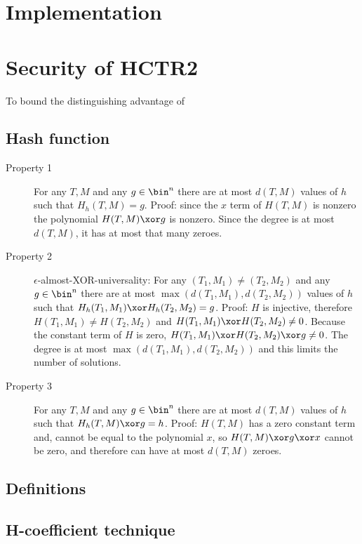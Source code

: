 \documentclass[letterpaper,11pt]{article}
\begin{document}
\section{Implementation}

\section{Security of HCTR2}
To bound the distinguishing advantage of

\subsection{Hash function}
\begin{description}
    \item[Property 1]
    For any \(T, M\) and any \(g \in \bin^n\)
    there are at most \(d(T, M)\)
    values of \(h\) such that \(H_h(T, M) = g\).
    Proof: since the \(x\) term of \(H(T, M)\) is nonzero
    the polynomial \(H(T, M) \xor g\) is nonzero.
    Since the degree is at most \(d(T, M)\), it has
    at most that many zeroes.
    \item[Property 2] 
    \(\epsilon\)-almost-XOR-universality: 
    For any \((T_1, M_1) \neq (T_2, M_2)\) and any \(g \in \bin^n\)
    there are at most \(\max(d(T_1, M_1), d(T_2, M_2))\)
    values of \(h\) such that \(H_h(T_1, M_1) \xor H_h(T_2, M_2) = g\).
    Proof: \(H\) is injective, therefore
    \(H(T_1, M_1) \neq H(T_2, M_2)\)
    and \(H(T_1, M_1) \xor H(T_2, M_2) \neq 0\).
    Because the constant term of \(H\) is zero, 
    \(H(T_1, M_1) \xor H(T_2, M_2) \xor g \neq 0\).
    The degree is at most \(\max(d(T_1, M_1), d(T_2, M_2))\)
    and this limits the number of solutions.
    \item[Property 3]
    For any \(T, M\) and any \(g \in \bin^n\)
    there are at most \(d(T, M)\)
    values of \(h\) such that \(H_h(T, M) \xor g = h\).
    Proof: \(H(T, M)\) has a zero constant term and,
    cannot be equal to the polynomial \(x\),
    so \(H(T, M) \xor g \xor x\) cannot be zero, and
    therefore can have at most \(d(T, M)\) zeroes.
\end{description}

\subsection{Definitions}
\subsection{H-coefficient technique}
\end{document}
